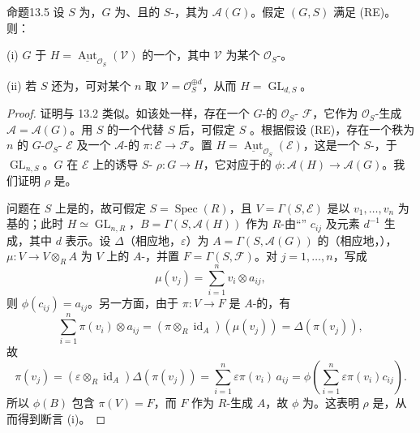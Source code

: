 \begin{SGAresult}{命题}{13.5}
设 $S$ 为，$G$ 为、且的 $S$-，其为 $\mathscr A(G)$。假定 $(G,S)$ 满足 (RE)。则：

(i) $G$ 于 $H=\underline{\operatorname{Aut}}_{\mathcal O_S}(\mathcal V)$ 的一个，其中 $\mathcal V$ 为某个 $\mathcal O_S$-。

(ii) 若 $S$ 还为，可对某个 $n$ 取 $\mathcal V=\mathcal O_S^{\oplus d}$，从而 $H=\operatorname{GL}_{d,S}$。
\end{SGAresult}
\begin{proof}
证明与 13.2 类似。如该处一样，存在一个 $G$-的 $\mathcal O_S$- $\mathcal F$，它作为 $\mathcal O_S$-生成 $\mathcal A=\mathscr A(G)$。用 $S$ 的一个代替 $S$ 后，可假定 $S$ 。根据假设 (RE)，存在一个秩为 $n$ 的 $G$-$\mathcal O_S$- $\mathcal E$ 及一个 $\mathcal A$-的 $\pi:\mathcal E\to\mathcal F$。置 $H=\underline{\operatorname{Aut}}_{\mathcal O_S}(\mathcal E)$，这是一个 $S$-，于 $\operatorname{GL}_{n,S}$。$G$ 在 $\mathcal E$ 上的诱导 $S$- $\rho:G\to H$，它对应于的 $\phi:\mathscr A(H)\to\mathscr A(G)$。我们证明 $\rho$ 是。

问题在 $S$ 上是的，故可假定 $S=\operatorname{Spec}(R)$，且 $V=\Gamma(S,\mathcal E)$ 是以 $v_1,\ldots,v_n$ 为基的；此时 $H\simeq\operatorname{GL}_{n,R}$，$B=\Gamma(S,\mathscr A(H))$ 作为 $R$-由“” $c_{ij}$ 及元素 $d^{-1}$ 生成，其中 $d$ 表示。设 $\Delta$（相应地，$\varepsilon$）为
$A=\Gamma(S,\mathscr A(G))$ 的（相应地，），$\mu:V\to V\otimes_R A$ 为 $V$ 上的 $A$-，并置 $F=\Gamma(S,\mathcal F)$。对 $j=1,\ldots,n$，写成
\[
\mu(v_j)=\sum_{i=1}^n v_i\otimes a_{ij},
\]
则 $\phi(c_{ij})=a_{ij}$。另一方面，由于 $\pi:V\to F$ 是 $A$-的，有
\[
\sum_{i=1}^n\pi(v_i)\otimes a_{ij}
=(\pi\otimes_R\operatorname{id}_A)(\mu(v_j))=\Delta(\pi(v_j)),
\]
故
\[
\pi(v_j)=(\varepsilon\otimes_R\operatorname{id}_A)\Delta(\pi(v_j))
=\sum_{i=1}^n\varepsilon\pi(v_i)\,a_{ij}
=\phi\left(\sum_{i=1}^n\varepsilon\pi(v_i)c_{ij}\right).
\]
所以 $\phi(B)$ 包含 $\pi(V)=F$，而 $F$ 作为 $R$-生成 $A$，故 $\phi$ 为。这表明 $\rho$ 是，从而得到断言 (i)。


\end{proof}
